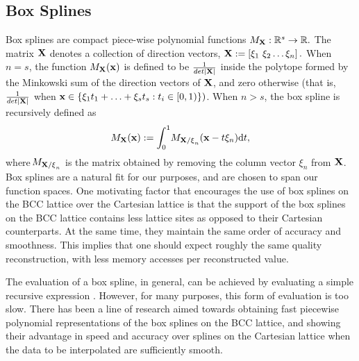 \subsection{Box Splines} \label{sec:box_review}
Box splines are compact piece-wise polynomial functions $ M_\mathbf{\mathbf{X}} : \mathbb{R}^s \to \mathbb{R}.$ The matrix $\mathbf{\mathbf{X}}$ denotes a collection of direction vectors, $\mathbf{\mathbf{X}} := \left[ \xi_1 \ \xi_2 \hdots \xi_n\right].$ When $n=s$, the function $M_\mathbf{\mathbf{X}}(\mathbf{x})$ is defined to be $\frac{1}{det|\mathbf{\mathbf{X}}|}$ inside the polytope formed by the Minkowski sum of the direction vectors of $\mathbf{\mathbf{X}}$, and zero otherwise (that is, $\frac{1}{det|\mathbf{\mathbf{X}}|}$ when $\mathbf{x} \in \{ \mathbf{\xi}_1 t_1 + \hdots + \mathbf{\xi}_s t_s  : t_i\in [0,1) \})$. When $n > s$, the box spline is recursively defined as {\small 
\begin{equation} \label{eq:box_def}
	M_{\mathbf{\Xii}}(\vx) := \int_0^1{\!M_{\mathbf{\Xii/\xi}_n}(\vx - t\mathbf{\xi}_n)} \mathrm{d}t,
\end{equation}}
where $\!M_{\mathbf{\mathbf{X}/\xi}_n}$ is the matrix obtained by removing the column vector $\xi_n$ from $\mathbf{\mathbf{X}}$. Box splines are a natural fit for our purposes, and are chosen to span our function spaces. One motivating factor that encourages the use of box splines on the BCC lattice over the Cartesian lattice is that the support of the box splines on the BCC lattice contains less lattice sites as opposed to their Cartesian counterparts. At the same time, they maintain the same order of accuracy and smoothness. This implies that one should expect roughly the same quality reconstruction, with less memory accesses per reconstructed value.

The evaluation of a box spline, in general, can be achieved by evaluating a simple recursive expression \cite{boorboxsplines}. However, for many purposes, this form of evaluation is too slow. There has been a line of research \cite{firstbox} aimed towards obtaining fast piecewise polynomial representations of the box splines on the BCC lattice, and showing their advantage in speed and accuracy over splines on the Cartesian lattice when the data to be interpolated are sufficiently smooth.

